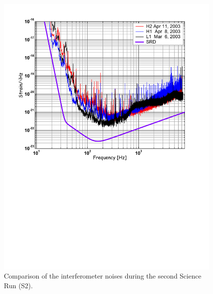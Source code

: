 \begin{figure}[!h]
\centerline{
\includegraphics[angle=0,width=6.5in]{Figures/Chap4/S2noiseComp.pdf}}
\caption[S2 Noise Curves]{Comparison of the interferometer noises during the
           second Science Run (S2).}
\label{fig:S2noiseComp}
\end{figure}


